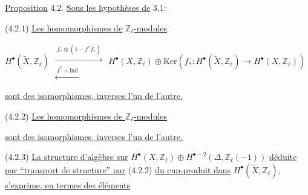 \underline{Proposition} 4.2. \underline{Sous les hypothèses de} 3.1:

(4.2.1) \underline{Les homomorphismes de} $\mathbb{Z}_{\ell}$\underline{-modules}

\begin{equation*}
H^{\bullet}(\widetilde{X},\mathbb{Z}_{\ell}) \; \begin{array}{c} \xrightarrow{\;f_{*}\oplus(1-f^{*}f_{*})\;} \\ \xleftarrow{\;f^{*}+\mathrm{ind}\;} \end{array} \; H^{\bullet}(X,\mathbb{Z}_{\ell}) \oplus \mathrm{Ker}(f_{*}:H^{\bullet}(\widetilde{X},\mathbb{Z}_{\ell}) \longrightarrow H^{\bullet}(X,\mathbb{Z}_{\ell})) \quad 
\end{equation*}


 \underline{sont des isomorphismes, inverses l'un de l'autre.}

(4.2.2) \underline{Les homomorphismes de $\mathbb{Z}_{\ell}$-modules}

\begin{center}
\end{center}
\underline{sont des isomorphismes, inverses l'un de l'autre.}

(4.2.3) \underline{La structure d'algèbre sur} $H^{\bullet}(X,\mathbb{Z}_{\ell}) \oplus H^{\bullet-2}(\Delta,\mathbb{Z}_{\ell}(-1))$ \underline{déduite par ``transport de structure'' par} (4.2.2) \underline{du cup-produit dans} $H^{\bullet}(\widetilde{X},\mathbb{Z}_{\ell})$, \underline{s'exprime, en termes des éléments}

